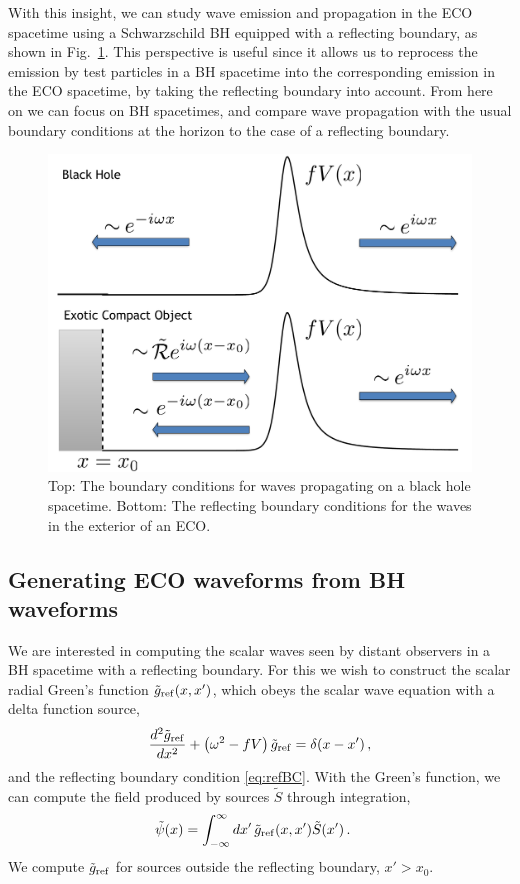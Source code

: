 \begin{refsection}
With this insight, we can study wave emission and propagation in the ECO spacetime using a Schwarzschild BH equipped with a reflecting boundary, as shown in Fig.~\ref{fig:BCs}.
This perspective is useful since it allows us to reprocess the emission by test particles in a BH spacetime into the corresponding emission in the ECO spacetime, by taking the reflecting boundary into account. From here on we can focus on BH spacetimes, and compare wave propagation with the usual boundary conditions at the horizon to the case of a reflecting boundary. 

\begin{figure}[t]
\includegraphics[width =0.98 \columnwidth]{chapter_echo/etc/BCfig}
\caption{Top: The boundary conditions for waves propagating on a black hole spacetime. Bottom: The reflecting boundary conditions for the waves in the exterior of an ECO.
}
\label{fig:BCs}
\end{figure}

\subsection{Generating ECO waveforms from BH waveforms}

\label{sec:ECOvsBH}

We are interested in computing the scalar waves seen by distant observers in a BH spacetime with a reflecting boundary.
For this we wish to construct the scalar radial Green's function $\tilde g_{\rm ref}(x,x')$, which obeys the scalar wave equation with a delta function source,
\begin{align}
\label{eq:RWGF}
\frac{d^2 \tilde g_{\rm ref}}{dx^2} + \left( \omega^2 - f V \right) \tilde g_{\rm ref} = \delta(x-x') \,,
\end{align}
and the reflecting boundary condition \eqref{eq:refBC}.
With the Green's function, we can compute the field produced by sources $\tilde S$ through integration,
\begin{align}
\label{eq:Sourcedpsi}
\tilde \psi(x) & = \int_{-\infty}^{\infty} dx' \, \tilde g_{\rm ref}(x,x') \tilde S(x')\,.
\end{align}
We compute $\tilde g_{\rm ref}$ for sources outside the reflecting boundary, $x'>x_0$.


\end{refsection}
